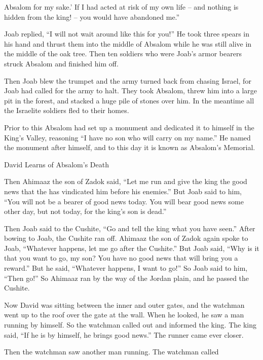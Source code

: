 {Absalom for my sake.’
If
I had acted
at risk
of my own life –
and nothing
is hidden
from
the king! – you would have abandoned me.”
\par }{\PP {}Joab
replied,
“I will not
wait
around like this
for you!” He took
three
spears
in his hand
and thrust
them into the middle
of Absalom
while he was still
alive
in the middle
of the oak tree.
Then
ten
soldiers
who were Joab’s
armor
bearers
struck
Absalom
and finished him off.
\par }{\PP {}Then
Joab
blew
the trumpet
and the army
turned back
from chasing
Israel,
for
Joab
had called for the army
to halt.
They took
Absalom,
threw
him into a large
pit
in the forest,
and stacked a huge pile
of stones
over
him. In the meantime
all
the Israelite
soldiers
fled
to their homes.
\par }{\PP {}Prior to this Absalom
had set up
a monument
and dedicated it to himself in the
King’s
Valley,
reasoning
“I have no
son
who will carry on
my name.”
He
named
the monument
after himself, and to this
day
it is known
as Absalom’s
Memorial.
\par }{\SH David Learns of Absalom’s Death
\par }{\PP {}Then Ahimaaz
the son
of Zadok
said,
“Let
me run
and give
the king
the good news
that
the {}
has vindicated
him before his enemies.”
But Joab
said
to him, “You will not
be a bearer
of good news
today.
You
will bear good news
some other
day,
but not
today,
for
the king’s
son
is dead.”
\par }{\PP {}Then Joab
said
to the Cushite,
“Go
and tell
the king
what
you have seen.”
After bowing
to Joab,
the Cushite
ran off.
Ahimaaz
the son
of Zadok
again
spoke
to
Joab,
“Whatever
happens,
let
me
go after
the Cushite.”
But Joab
said,
“Why
is
it that you
want
to go, my son? You have no
good news
that will bring you a reward.”
But
he said, “Whatever
happens,
I want to go!” So Joab said
to him, “Then
go!” So Ahimaaz
ran
by the way
of
the Jordan plain,
and he passed
the
Cushite.
\par }{\PP {}Now David
was sitting
between
the inner and outer gates,
and the watchman
went
up to
the roof
over the gate
at the wall.
When he looked,
he saw
a man
running
by himself.
So the watchman
called
out and informed
the king.
The king
said,
“If
he is by himself,
he brings good news.”
The runner
came ever closer.
\par }{\PP {}Then the watchman
saw
another
man
running.
The watchman
called
}
